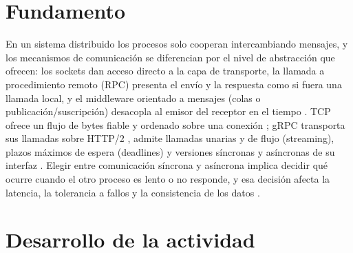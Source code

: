 \documentclass[11pt]{article}
\newcommand{\seccion}[1]{\section{\textcolor{utegreendk}{#1}}}
\begin{document}
\seccion{Fundamento}

En un sistema distribuido los procesos solo cooperan intercambiando mensajes, y los mecanismos de comunicación se diferencian por el nivel de abstracción que ofrecen: los sockets dan acceso directo a la capa de transporte, la llamada a procedimiento remoto (RPC) presenta el envío y la respuesta como si fuera una llamada local, y el middleware orientado a mensajes (colas o publicación/suscripción) desacopla al emisor del receptor en el tiempo \citep{vansteen_tanenbaum_2023}. TCP ofrece un flujo de bytes fiable y ordenado sobre una conexión \citep{rfc9293_2022}; gRPC transporta sus llamadas sobre HTTP/2 \citep{grpc_http2,rfc9113_2022}, admite llamadas unarias y de flujo (streaming), plazos máximos de espera (deadlines) y versiones síncronas y asíncronas de su interfaz \citep{grpc_concepts}. Elegir entre comunicación síncrona y asíncrona implica decidir qué ocurre cuando el otro proceso es lento o no responde, y esa decisión afecta la latencia, la tolerancia a fallos y la consistencia de los datos \citep{kleppmann_riccomini_2026}.

\seccion{Desarrollo de la actividad}
\end{document}
